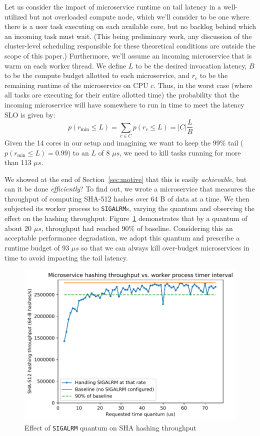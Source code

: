Let us consider the impact of microservice runtime on tail latency in a well-utilized
but not overloaded compute node, which we'll consider to be one where there is a user
task executing on each available core, but no backlog behind which an incoming task
must wait.  (This being preliminary work, any discussion of the cluster-level
scheduling responsible for these theoretical conditions are outside the scope of
this paper.)  Furthermore, we'll assume an incoming microservice that is warm on each
worker thread.  We define $L$ to be the desired invocation latency, $B$ to be the
compute budget allotted to each microservice, and $r_c$ to be the remaining runtime
of the microservice on CPU $c$.  Thus, in the worst case (where all tasks are
executing for their entire allotted time) the probability that the incoming
microservice will have somewhere to run in time to meet the latency SLO is given by:
\begin{equation}
p(r_\textrm{min} \le L) = \sum\limits_{c \in C} p(r_c \le L) = \big| C \big| \frac{L}{B}
\end{equation}
Given the 14 cores in our setup and imagining we want to keep the 99\% tail
($p(r_\textrm{min} \le L) = 0.99$) to an $L$ of 8 $\mu{}s$, we need to kill tasks
running for more than 113 $\mu{}s$.

We showed at the end of Section~\ref{sec:motive} that this is easily
\textit{achievable}, but can it be done \textit{efficiently}?  To find out, we wrote
a microservice that measures the throughput of computing SHA-512 hashes over 64 B of
data at a time.  We then subjected its worker process to \texttt{SIGALRM}s, varying
the quantum and observing the effect on the hashing throughput.
Figure~\ref{fig:hashtput} demonstrates that by a quantum of about 20 $\mu{}s$,
throughput had reached 90\% of baseline.  Considering this an acceptable performance
degradation, we adopt this quantum and prescribe a runtime budget of 93 $\mu{}s$ so
that we can always kill over-budget microservices in time to avoid impacting the tail
latency.

\begin{figure}
\includegraphics[width=\columnwidth]{figs/2018-02-02-evaluation_quantum-hasher_throughput-throughput}
\caption{Effect of \texttt{SIGALRM} quantum on SHA hashing throughput}
\label{fig:hashtput}
\end{figure}

